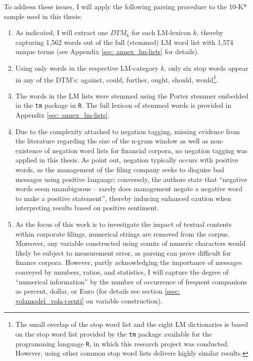 To address these issues, I will apply the following parsing procedure to the 10-K* sample used in this thesis:
\begin{enumerate}[(1)]
\item As indicated, I will extract one $DTM_k$ for each LM-lexicon $k$, thereby capturing 1,562 words out of the full (stemmed) LM word list with 1,574 unique terms (see Appendix \ref{sec: annex_lm-lists} for details). 
\item Using only words in the respective LM-category $k$, only six stop words appear in any of the DTM's: \textsf{against, could, further, ought, should, would}\footnote{The small overlap of the stop word list and the eight LM dictionaries is based on the stop word list provided by the \texttt{tm} package available for the programming language \texttt{R}, in which this research project was conducted. However, using other common stop word lists delivers highly similar results.}.
\item The words in the LM lists were stemmed using the Porter stemmer embedded in the \texttt{tm} package in \texttt{R}. The full lexicon of stemmed words is provided in Appendix \ref{sec: annex_lm-lists}. 
\item Due to the complexity attached to negation tagging, missing evidence from the literature regarding the size of the n-gram window as well as non-existence of negation word lists for financial corpora, no negation tagging was applied in this thesis. As \textcite[1217]{LM-meta-2016} point out, negation typically occurs with positive words, as the management of the filing company seeks to disguise bad messages using positive language; conversely, the authors state that \enquote{negative words seem unambiguous -- rarely does management negate a negative word to make a positive statement}, thereby inducing enhanced caution when interpreting results based on positive sentiment. 
\item As the focus of this work is to investigate the impact of textual contents within corporate filings, numerical strings are removed from the corpus. Moreover, any variable constructed using counts of numeric characters would likely be subject to measurement error, as parsing can prove difficult for finance corpora. However, partly acknowledging the importance of messages conveyed by numbers, ratios, and statistics, I will capture the degree of \enquote{numerical information} by the number of occurrence of frequent companions as \textsf{percent}, \textsf{dollar}, or \textsf{Euro} (for details see section \ref{ssec: volamodel_vola+senti} on variable construction). 
\end{enumerate}

